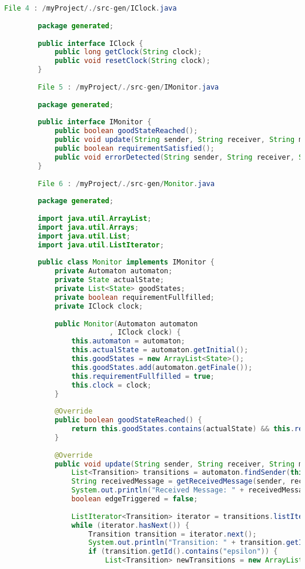 \begin{lstlisting}[language=java, caption={példa unit teszteset.},captionpos=b]
		File 4 : /myProject/./src-gen/IClock.java
		
		package generated;
					
		public interface IClock {
			public long getClock(String clock);
			public void resetClock(String clock);
		}
		
		File 5 : /myProject/./src-gen/IMonitor.java
		
		package generated;
					
		public interface IMonitor {
			public boolean goodStateReached();
			public void update(String sender, String receiver, String messageType, String[] parameters);
			public boolean requirementSatisfied();
			public void errorDetected(String sender, String receiver, String messageType, String[] parameters);
		}
		
		File 6 : /myProject/./src-gen/Monitor.java
		
		package generated;
		
		import java.util.ArrayList;
		import java.util.Arrays;
		import java.util.List;
		import java.util.ListIterator;
		
		public class Monitor implements IMonitor {
			private Automaton automaton;
			private State actualState;
			private List<State> goodStates;
			private boolean requirementFullfilled;
			private IClock clock;
			
			public Monitor(Automaton automaton
						 , IClock clock) {
				this.automaton = automaton;
				this.actualState = automaton.getInitial();
				this.goodStates = new ArrayList<State>();
				this.goodStates.add(automaton.getFinale());
				this.requirementFullfilled = true;
				this.clock = clock;
			}
			
			@Override
			public boolean goodStateReached() {
				return this.goodStates.contains(actualState) && this.requirementFullfilled;
			}
		
			@Override
			public void update(String sender, String receiver, String messageType, String[] parameters) {
				List<Transition> transitions = automaton.findSender(this.actualState);
				String receivedMessage = getReceivedMessage(sender, receiver, messageType, parameters);
				System.out.println("Received Message: " + receivedMessage);
				boolean edgeTriggered = false;
				
				ListIterator<Transition> iterator = transitions.listIterator();
				while (iterator.hasNext()) {
					Transition transition = iterator.next();
					System.out.println("Transition: " + transition.getId());
					if (transition.getId().contains("epsilon")) {
						List<Transition> newTransitions = new ArrayList<Transition>(automaton.findSender(transition.getReceiver()));
		

\end{lstlisting}
